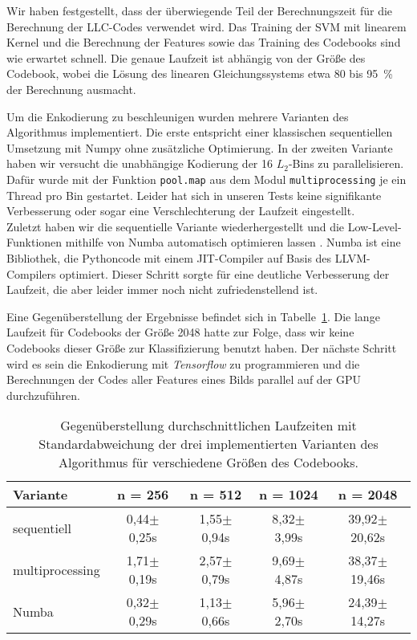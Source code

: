 Wir haben festgestellt, dass der überwiegende Teil der Berechnungszeit für die Berechnung der LLC-Codes verwendet wird. Das Training der SVM mit linearem Kernel und die Berechnung der Features sowie das Training des Codebooks sind wie erwartet schnell. Die genaue Laufzeit ist abhängig von der Größe des Codebook, wobei die Lösung des linearen Gleichungssystems etwa 80 bis 95~\% der Berechnung ausmacht.

Um die Enkodierung zu beschleunigen wurden mehrere Varianten des Algorithmus implementiert. Die erste entspricht einer klassischen sequentiellen Umsetzung mit Numpy ohne zusätzliche Optimierung. In der zweiten Variante haben wir versucht die unabhängige Kodierung der 16 $L_2$-Bins zu parallelisieren. Dafür wurde mit der Funktion \texttt{pool.map} aus dem Modul \texttt{multiprocessing} je ein Thread pro Bin gestartet. Leider hat sich in unseren Tests keine signifikante Verbesserung oder sogar eine Verschlechterung der Laufzeit eingestellt.\\
Zuletzt haben wir die sequentielle Variante wiederhergestellt und die Low-Level-Funktionen mithilfe von Numba automatisch optimieren lassen \cite{numba}. Numba ist eine Bibliothek, die Pythoncode mit einem JIT-Compiler auf Basis des LLVM-Compilers optimiert. Dieser Schritt sorgte für eine deutliche Verbesserung der Laufzeit, die aber leider immer noch nicht zufriedenstellend ist. 

Eine Gegenüberstellung der Ergebnisse befindet sich in Tabelle~\ref{tab:runtime}. Die lange Laufzeit für Codebooks der Größe 2048 hatte zur Folge, dass wir keine Codebooks dieser Größe zur Klassifizierung benutzt haben. Der nächste Schritt wird es sein die Enkodierung mit \emph{Tensorflow} zu programmieren und die Berechnungen der Codes aller Features eines Bilds parallel auf der GPU durchzuführen.

\begin{table}
	\centering
	\begin{tabular}{|l|c|c|c|c|}
		\hline
		\textbf{Variante} & \textbf{n = 256} & \textbf{n = 512} & \textbf{n = 1024} & \textbf{n = 2048} \\ \hline
		sequentiell & 0,44$\pm$0,25s & 1,55$\pm$0,94s & 8,32$\pm$3,99s & 39,92$\pm$20,62s \\ \hline
		multiprocessing & 1,71$\pm$0,19s & 2,57$\pm$0,79s & 9,69$\pm$4,87s & 38,37$\pm$19,46s \\ \hline
		Numba & 0,32$\pm$0,29s & 1,13$\pm$0,66s & 5,96$\pm$2,70s & 24,39$\pm$14,27s \\ \hline
	\end{tabular}
\caption{Gegenüberstellung durchschnittlichen Laufzeiten mit Standardabweichung der drei implementierten Varianten des Algorithmus für verschiedene Größen des Codebooks.}
\label{tab:runtime}
\end{table} 

